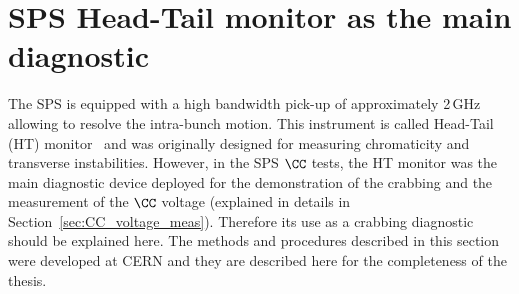 



\section{SPS Head-Tail monitor as the main diagnostic}\label{sec:HT_info}

The SPS is equipped with a high bandwidth pick-up of approximately 2\,GHz allowing to resolve the intra-bunch motion. This instrument is called Head-Tail (HT) monitor~\cite{sps_headtail_monitor} and was originally designed for measuring chromaticity and transverse instabilities. However, in the SPS $\CC$ tests, the HT monitor was the main diagnostic device deployed for the demonstration of the crabbing and the measurement of the $\CC$ voltage (explained in details in Section~\ref{sec:CC_voltage_meas}). Therefore its use as a crabbing diagnostic should be explained here. The methods and procedures described in this section were developed at CERN and they are described here for the completeness of the thesis.

